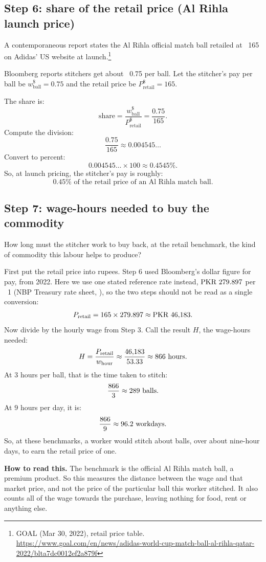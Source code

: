\documentclass[11pt]{article}
\newcommand{\PKR}{\text{PKR}}
\newcommand{\USD}{\text{USD}}
\newcommand{\uBall}{\text{ball}}
\newcommand{\uHour}{\text{hour}}
\begin{document}
\subsection{Step 6: share of the retail price (Al Rihla launch price)}
A contemporaneous report states the Al Rihla official match ball retailed at \USD{}~165 on Adidas’ US website at launch.\footnote{GOAL (Mar 30, 2022), retail price table. \url{https://www.goal.com/en/news/adidas-world-cup-match-ball-al-rihla-qatar-2022/blta7dc0012ef2a879f}}

Bloomberg reports stitchers get about \USD{}~0.75 per ball.
Let the stitcher’s pay per ball be \(w^{\$}_{\uBall}=0.75\) and the retail price be \(P^{\$}_{\text{retail}}=165\).

The share is:
\[
  \text{share}=\frac{w^{\$}_{\uBall}}{P^{\$}_{\text{retail}}}=\frac{0.75}{165}.
\]
Compute the division:
\[
  \frac{0.75}{165}\approx 0.004545\ldots
\]
Convert to percent:
\[
  0.004545\ldots \times 100 \approx 0.4545\%.
\]
So, at launch pricing, the stitcher’s pay is roughly:
\[
  0.45\% \text{ of the retail price of an Al Rihla match ball.}
\]

\subsection{Step 7: wage-hours needed to buy the commodity}
How long must the stitcher work to buy back, at the retail benchmark, the kind of commodity this labour helps to produce?

First put the retail price into rupees. Step 6 used Bloomberg's dollar figure for pay, from 2022. Here we use one stated reference rate instead, \(\PKR{}~\USDPKR\) per \USD{}~1 (NBP Treasury rate sheet, \RateDate), so the two steps should not be read as a single conversion:
\[
  P_{\text{retail}} = 165\times \USDPKR \approx \PKR{}~\SkRetail.
\]
Now divide by the hourly wage from Step 3. Call the result \(H\), the wage-hours needed:
\[
  H=\frac{P_{\text{retail}}}{w_{\uHour}}\approx\frac{\SkRetail}{\SkHourly}\approx \SkHours\ \text{hours}.
\]
At \(3\) hours per ball, that is the time taken to stitch:
\[
  \frac{\SkHours}{3}\approx \SkBalls\ \text{balls}.
\]
At \(9\) hours per day, it is:
\[
  \frac{\SkHours}{9}\approx \SkDays\ \text{workdays}.
\]
So, at these benchmarks, a worker would stitch about \SkBalls{} balls, over about \SkDays{} nine-hour days, to earn the retail price of one.

\textbf{How to read this.} The benchmark is the official Al Rihla match ball, a premium product. So this measures the distance between the wage and that market price, and not the price of the particular ball this worker stitched. It also counts all of the wage towards the purchase, leaving nothing for food, rent or anything else.
\end{document}
